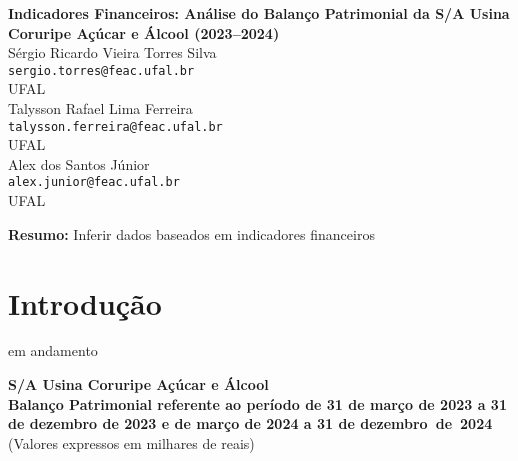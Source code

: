 \documentclass[1pt,a4paper]{article}
\begin{document}
	
	\begin{center}
		\LARGE \textbf{Indicadores Financeiros: Análise do Balanço Patrimonial da S/A Usina Coruripe Açúcar e Álcool (2023–2024)  
		 } \\[1cm]
		
		\large
		Sérgio Ricardo Vieira Torres Silva\\
		\texttt{sergio.torres@feac.ufal.br}\\
		UFAL\\[0.5cm]
		
		Talysson Rafael Lima Ferreira\\
		\texttt{talysson.ferreira@feac.ufal.br}\\
		UFAL\\[0.5cm]
		
		Alex dos Santos Júnior\\
		\texttt{alex.junior@feac.ufal.br}\\
		UFAL\\[0.5cm]
		
		
	\end{center}
	
	\vspace{1cm}
	
	\noindent \textbf{Resumo:} Inferir dados baseados em indicadores financeiros 
	
	
	\section{Introdução}
	
	\hspace*{1.5cm} em andamento
	
	\newpage
	
	
		
		\begin{center}
			\textbf{\Large S/A Usina Coruripe Açúcar e Álcool}\\
			\textbf{Balanço Patrimonial referente ao período de 31 de março de 2023 a 31 de dezembro de 2023 e de março de 2024 a 31 de dezembro de 2024}\\
			(Valores expressos em milhares de reais)
		\end{center}
		
		
		
\end{document}
